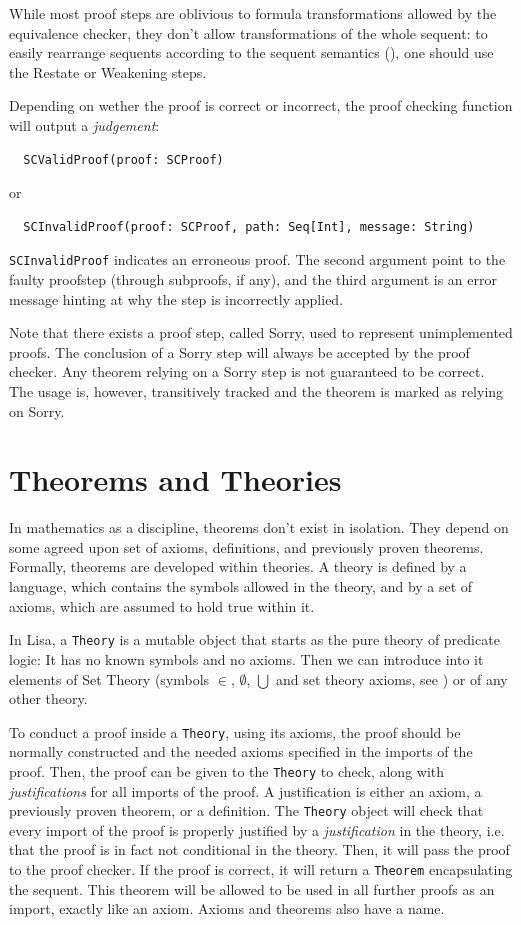 While most proof steps are oblivious to formula transformations allowed by the equivalence checker, they don't allow transformations of the whole sequent: to easily rearrange sequents according to the sequent semantics (), one should use the Restate or Weakening steps.

Depending on wether the proof is correct or incorrect, the proof checking function will output a \textit{judgement}:
\begin{lstlisting}
  SCValidProof(proof: SCProof)
\end{lstlisting}
or
\begin{lstlisting}
  SCInvalidProof(proof: SCProof, path: Seq[Int], message: String)
\end{lstlisting}

\lstinline|SCInvalidProof|{} indicates an erroneous proof. The second argument point to the faulty proofstep (through subproofs, if any), and the third argument is an error message hinting at why the step is incorrectly applied.

Note that there exists a proof step, called Sorry, used to  represent unimplemented proofs. The conclusion of a Sorry step will always be accepted by the proof checker. Any theorem relying on a Sorry step is not guaranteed to be correct. The usage is, however, transitively tracked and the theorem is marked as relying on Sorry.

\section{Theorems and Theories}
\label{sec:TheoremsAndTheories}

In mathematics as a discipline, theorems don't exist in isolation. They depend on some agreed upon set of axioms, definitions, and previously proven theorems. Formally, theorems are developed within theories. A theory is defined by a language, which contains the symbols allowed in the theory, and by a set of axioms, which are assumed to hold true within it.

In Lisa, a \lstinline|Theory|{} is a mutable object that starts as the pure theory of predicate logic: It has no known symbols and no axioms. Then we can introduce into it elements of Set Theory (symbols $\in$, $\emptyset$, $\bigcup$ and set theory axioms, see ) or of any other theory.

To conduct a proof inside a \lstinline|Theory|{}, using its axioms, the proof should be normally constructed and the needed axioms specified in the imports of the proof. Then, the proof can be given to the \lstinline|Theory|{} to check, along with \textit{justifications} for all imports of the proof. A justification is either an axiom, a previously proven theorem, or a definition. The \lstinline|Theory|{} object will check that every import of the proof is properly justified by a \textit{justification} in the theory, i.e. that the proof is in fact not conditional in the theory. Then, it will pass the proof to the proof checker. If the proof is correct, it will return a \lstinline|Theorem|{} encapsulating the sequent. This theorem will be allowed to be used in all further proofs as an import, exactly like an axiom. Axioms and theorems also have a name.

